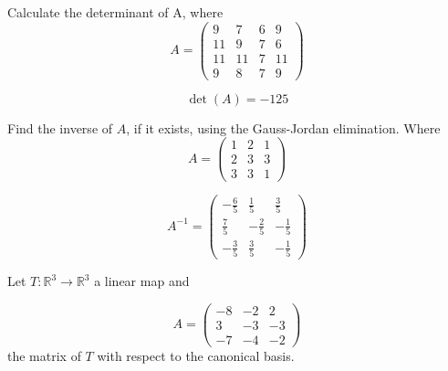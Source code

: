 \begin{questions}

\question Calculate the determinant of A, where
$$
A=\left(\begin{array}{rrrr}
9 & 7 & 6 & 9 \\
11 & 9 & 7 & 6 \\
11 & 11 & 7 & 11 \\
9 & 8 & 7 & 9
\end{array}\right)
$$

\begin{solution}
$$\det(A)=-125$$
\end{solution}

\question Find the inverse of $A$, if it exists, using the Gauss-Jordan elimination. Where
$$
A=\left(\begin{array}{rrr}
1 & 2 & 1 \\
2 & 3 & 3 \\
3 & 3 & 1
\end{array}\right)
$$

\begin{solution}
$$A^{-1}=\left(\begin{array}{rrr}
-\frac{6}{5} & \frac{1}{5} & \frac{3}{5} \\
\frac{7}{5} & -\frac{2}{5} & -\frac{1}{5} \\
-\frac{3}{5} & \frac{3}{5} & -\frac{1}{5}
\end{array}\right)$$
\end{solution}

\question Let $T:\mathbb{R}^3\rightarrow\mathbb{R}^3$  a linear map and
 
$$
A=\left(\begin{array}{rrr}
-8 & -2 & 2 \\
3 & -3 & -3 \\
-7 & -4 & -2
\end{array}\right)
$$
the matrix of $T$ with respect to the canonical basis.
\end{questions}

